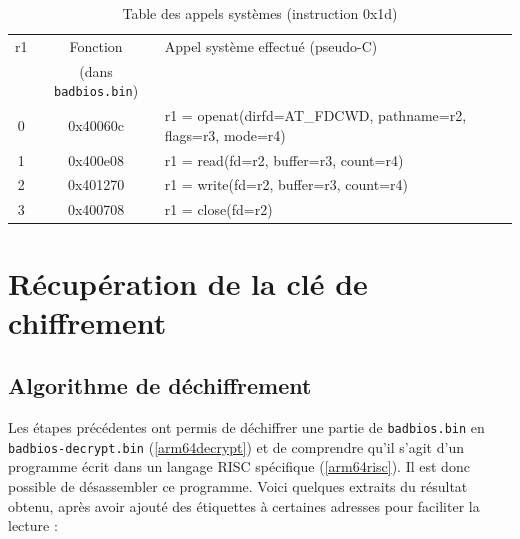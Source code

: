 \documentclass[a4paper,10pt]{article}
\begin{document}
\begin{table}[h]
\begin{center}
\begin{tabular}{|c|c|l|}
  \hline
  r1 & Fonction & Appel système effectué (pseudo-C) \\
   & (dans \texttt{badbios.bin}) & \\
  \hline
  0 & 0x40060c & r1 = openat(dirfd=AT\_FDCWD, pathname=r2, flags=r3, mode=r4) \\
  1 & 0x400e08 & r1 = read(fd=r2, buffer=r3, count=r4) \\
  2 & 0x401270 & r1 = write(fd=r2, buffer=r3, count=r4) \\
  3 & 0x400708 & r1 = close(fd=r2) \\
  \hline
\end{tabular}
\end{center}
\caption{Table des appels systèmes (instruction 0x1d)}
\label{badbiosRISCsyscall}
\end{table}

\clearpage
\section{Récupération de la clé de chiffrement}

\subsection{Algorithme de déchiffrement}
\label{badbiosRISCDecrypt}

Les étapes précédentes ont permis de déchiffrer une partie de \texttt{badbios.bin} en \texttt{badbios-decrypt.bin} (\ref{arm64decrypt}) et de comprendre qu'il s'agit d'un programme écrit dans un langage RISC spécifique (\ref{arm64risc}). Il est donc possible de désassembler ce programme. Voici quelques extraits du résultat obtenu, après avoir ajouté des étiquettes à certaines adresses pour faciliter la lecture :
\end{document}
